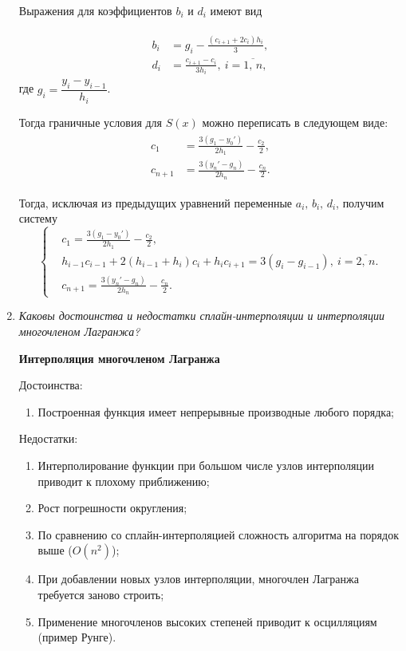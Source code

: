 \documentclass[12pt, a4paper]{article}
\begin{document}
\begin{enumerate}
		Выражения для коэффициентов $ b_i $ и $ d_i $ имеют вид
		
		\begin{gather*}
			\begin{aligned}
				b_i &= g_i - \frac{(c_{i + 1} + 2 c_i) h_i}{3}, \\
				d_i &= \frac{c_{i + 1} -c_i}{3 h_i}, \: i = \overline{1, \, n},
			\end{aligned}
		\end{gather*}
		где $ g_i = \dfrac{y_i - y_{i - 1}}{h_i} $.
		
		Тогда граничные условия для $ S(x) $ можно переписать в следующем виде:
		\begin{gather*}
			\begin{aligned}
				c_1 &= \frac{3 (g_1 - y_0')}{2 h_1} - \frac{c_2}{2}, \\
				c_{n + 1} &= \frac{3 (y_n' - g_n)}{2 h_n} - \frac{c_n}{2}.
			\end{aligned}
		\end{gather*}
		
		Тогда, исключая из предыдущих уравнений переменные $ a_i, \, b_i, \, d_i $, получим систему
		\begin{equation*}
			\left\{
			\begin{aligned}
				&c_1 = \frac{3 (g_1 - y_0')}{2 h_1} - \frac{c_2}{2}, \\
				&h_{i - 1} c_{i - 1} + 2 (h_{i - 1} + h_i) c_i + h_i c_{i + 1} = 3 (g_i - g_{i - 1}),  \: i = \overline{2, \, n}. \\
				&c_{n + 1} = \frac{3 (y_n' - g_n)}{2 h_n} - \frac{c_n}{2}.
			\end{aligned}
			\right.
		\end{equation*}
		\smallskip
		
		\item \textit{Каковы достоинства и недостатки сплайн-интерполяции
			и интерполяции многочленом Лагранжа?}
		\smallskip
		
		\textbf{Интерполяция многочленом Лагранжа}
		
		
		Достоинства:
		\begin{enumerate}
			\item Построенная функция имеет непрерывные производные любого порядка;
		\end{enumerate}
		Недостатки:
		\begin{enumerate}
			\item Интерполирование функции при большом числе узлов интерполяции приводит к плохому приближению;
			\item Рост погрешности округления;
			\item По сравнению со сплайн-интерполяцией сложность алгоритма на порядок выше ($O(n^2)$);
			\item При добавлении новых узлов интерполяции, многочлен Лагранжа требуется заново строить;
			\item Применение многочленов высоких степеней приводит к осцилляциям (пример Рунге). 
		\end{enumerate}
		

\end{enumerate}
\end{document}
